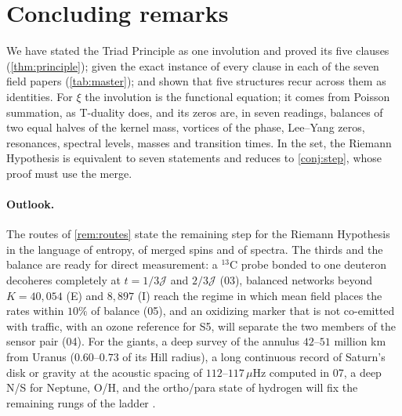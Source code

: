 \documentclass[11pt]{article}
\theoremstyle{definition}\newtheorem{definition}[theorem]{Definition}
\theoremstyle{remark}\newtheorem{remark}[theorem]{Remark}
\begin{document}
\section{Concluding remarks}\label{sec:concl}
We have stated the Triad Principle as one involution and proved its five clauses (\cref{thm:principle}); given the exact instance of every clause in each of the seven field papers (\cref{tab:master}); and shown that five structures recur across them as identities. For $\xi$ the involution is the functional equation; it comes from Poisson summation, as T-duality does, and its zeros are, in seven readings, balances of two equal halves of the kernel mass, vortices of the phase, Lee--Yang zeros, resonances, spectral levels, masses and transition times. In the set, the Riemann Hypothesis is equivalent to seven statements and reduces to \cref{conj:step}, whose proof must use the merge.

\paragraph{Outlook.} The routes of \cref{rem:routes} state the remaining step for the Riemann Hypothesis in the language of entropy, of merged spins and of spectra. The thirds and the balance are ready for direct measurement: a ${}^{13}$C probe bonded to one deuteron decoheres completely at $t=1/3\mathcal J$ and $2/3\mathcal J$ (03), balanced networks beyond $K=40{,}054$ (E) and $8{,}897$ (I) reach the regime in which mean field places the rates within $10\%$ of balance (05), and an oxidizing marker that is not co-emitted with traffic, with an ozone reference for S5, will separate the two members of the sensor pair (04). For the giants, a deep survey of the annulus $42$--$51$ million km from Uranus ($0.60$--$0.73$ of its Hill radius), a long continuous record of Saturn's disk or gravity at the acoustic spacing of $112$--$117\,\mu$Hz computed in 07, a deep N/S for Neptune, O/H, and the ortho/para state of hydrogen will fix the remaining rungs of the ladder \cite{SPlanet}.
\end{document}
